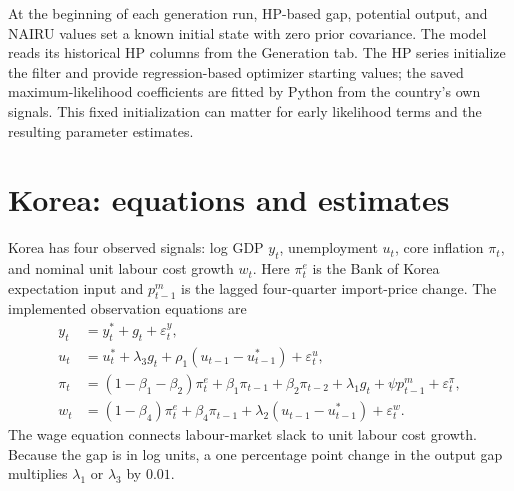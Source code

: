 \documentclass[11pt,a4paper]{article}
\newcommand{\NAIRU}{u^{*}}
\newcommand{\gap}{g}
\newcommand{\eps}{\varepsilon}
\begin{document}
At the beginning of each generation run, HP-based gap, potential output, and
NAIRU values set a known initial state with zero prior covariance. The model reads its historical HP columns from the Generation tab. The HP series initialize the
filter and provide regression-based optimizer starting values; the saved
maximum-likelihood coefficients are fitted by Python from the country's own
signals. This fixed initialization can matter for early likelihood terms and
the resulting parameter estimates.

\section{Korea: equations and estimates}
Korea has four observed signals: log GDP $y_t$, unemployment $u_t$, core
inflation $\pi_t$, and nominal unit labour cost growth $w_t$. Here
$\pi_t^e$ is the Bank of Korea expectation input and $p_{t-1}^m$ is the
lagged four-quarter import-price change. The implemented observation
equations are
\begin{align}
 y_t &= y_t^*+\gap_t+\eps^y_t,\\
 u_t &= \NAIRU_t+\lambda_3\gap_t
       +\rho_1(u_{t-1}-\NAIRU_{t-1})+\eps^u_t,\\
 \pi_t &= (1-\beta_1-\beta_2)\pi_t^e
      +\beta_1\pi_{t-1}+\beta_2\pi_{t-2}
      +\lambda_1\gap_t+\psi p_{t-1}^m+\eps^\pi_t,\\
 w_t &= (1-\beta_4)\pi_t^e+\beta_4\pi_{t-1}
      +\lambda_2(u_{t-1}-\NAIRU_{t-1})+\eps^w_t.
\end{align}
The wage equation connects labour-market slack to unit labour cost growth.
Because the gap is in log units, a one percentage point change in the output
gap multiplies $\lambda_1$ or $\lambda_3$ by $0.01$.
\end{document}
